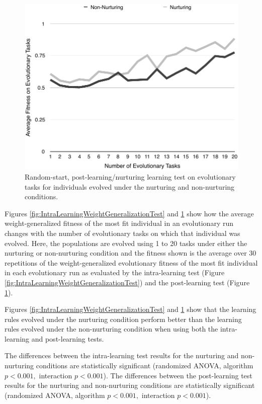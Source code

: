 \documentclass[master]{outhesis}
\begin{document}
\begin{figure}[h]
	\centering
	\includegraphics{NurturingLearningTestPlot.pdf}
	\caption{Random-start, post-learning/nurturing learning test on evolutionary tasks for individuals evolved under the nurturing and non-nurturing conditions.}
	\label{fig:PostLearningWeightGeneralizationTest}
\end{figure}

Figures \ref{fig:IntraLearningWeightGeneralizationTest} and \ref{fig:PostLearningWeightGeneralizationTest} show how the average weight-generalized fitness of the most fit individual in an evolutionary run changes with the number of evolutionary tasks on which that individual was evolved.
Here,
the populations are evolved using 1 to 20 tasks under either the nurturing or non-nurturing condition
and the fitness shown is the average over 30 repetitions of the weight-generalized evolutionary fitness of the most fit individual in each evolutionary run
as evaluated by the intra-learning test (Figure \ref{fig:IntraLearningWeightGeneralizationTest})
and the post-learning test (Figure \ref{fig:PostLearningWeightGeneralizationTest}).

Figures \ref{fig:IntraLearningWeightGeneralizationTest} and \ref{fig:PostLearningWeightGeneralizationTest} show that
the learning rules evolved under the nurturing condition perform better than the learning rules evolved under the non-nurturing condition
when using both the intra-learning and post-learning tests.

The differences between the intra-learning test results for the nurturing and non-nurturing conditions are statistically significant (randomized ANOVA, algorithm $p < 0.001,$ interaction $p < 0.001$). The differences between the post-learning test results for the nurturing and non-nurturing conditions are statistically significant (randomized ANOVA, algorithm $p < 0.001,$ interaction $p < 0.001$).
\end{document}
